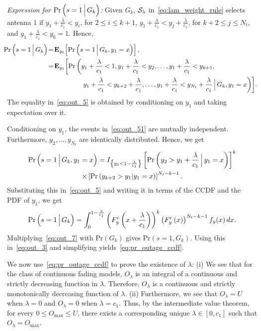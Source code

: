 \documentclass[12pt,draftcls,peerreview,onecolumn]{IEEEtran}
\newcommand{\brac}[1]{\left({#1}\right)}
\newcommand{\cbrac}[1]{\left\{{#1}\right\}}
\newcommand{\indic}[1]{I_{\cbrac{#1}}}
\newcommand{\prob}[1]{\text{Pr}\brac{#1}}
\newcommand{\given}{\arrowvert}
\newcommand{\Given}{\Big\arrowvert}
\newcommand{\setG}{G}
\newcommand{\setGk}{\setG_k}
\newcommand{\lam}{\lambda}
\newcommand{\Nt}{{N_t}}
\newcommand{\outmax}{O_{\text{max}}}
\newcommand{\cone}{c_{1}}
\newcommand{\out}{O}
\newcommand{\m}{\cone}
\newcommand{\lambym}{\frac{\lam}{\m}}
\newcommand{\yk}[1]{y_{#1}}
\newcommand{\ykplambym}[1]{\yk{#1}+\lambym}
\newcommand{\un}{U}
\newcommand{\callamrule}{{\cal S_{{\lam}}}}
\newcommand{\outlam}{\out_{\lam}}
\begin{document}
{\em Expression for $\prob{s = 1\Given\setGk}$:} Given $\setGk$, $\callamrule$ in~\eqref{eq:lam_weight_rule} selects antenna 1 if $\ykplambym{1}<\yk{i}$, for $2\leq i \leq k+1$,  $\ykplambym{1}<\ykplambym{j}$, for $k+2\leq j \leq \Nt$, and $\ykplambym{1}<\yk{0}=1$. Hence,
%
\begin{align}
\label{eq:out_5}
\!\!\!\prob{s = 1\Given \setGk }&\!=\!{\bf{E}}_{\yk{1}}\!\left[\prob{s = 1\Given\setGk,\yk{1}=x}\right] ,\\
\label{eq:out_51}
&\!=\!{\bf{E}}_{\yk{1}}\!\left[\text{Pr}\left(\ykplambym{1} < 1, \ykplambym{1}<\yk{2}, \dots ,\ykplambym{1}<\yk{k+1},\right.\right.\nonumber\\
&\quad\quad\quad\quad\quad\left.\left.
\ykplambym{1}<\ykplambym{k+2}, \dots ,\ykplambym{1}<\ykplambym{\Nt}\Given\setGk,\yk{1}=x\right)\right]\!.
\end{align} 
%
The equality in~\eqref{eq:out_5} is obtained by conditioning on $\yk{1}$ and taking expectation over it. 

Conditioning on $\yk{1}$, the events in~\eqref{eq:out_51} are mutually independent. Furthermore, $\yk{2},\ldots,\yk{\Nt} $ are identically distributed. Hence, we get
%
\begin{multline}
\text{Pr}\brac{s=1\Given \setGk, \yk{1}=x} = \indic{\yk{1}<1-\lambym}\left[\text{Pr}\brac{\yk{2}>\yk{1}+\lambym\Given\yk{1}=x}\right]^{k}\\\times \left[\text{Pr}\brac{\yk{k+2}>\yk{1}\given\yk{1}=x}\right]^{\Nt-k-1}.
\label{eq:out_6}
\end{multline}
%
Substituting this in~\eqref{eq:out_5} and writing it in terms of the CCDF and the PDF of $\yk{1}$, we get 
\begin{equation}
\text{Pr}\brac{s=1\Given\setGk} =\int_{0}^{1-\lambym}\left(F_{y}^{c}\left(x+\lambym\right)\right)^k \left(F_{y}^{c}\left(x\right)\right)^{\Nt-k-1}f_{y}(x)\,dx.
\label{eq:out_7}
\end{equation}
Multiplying~\eqref{eq:out_7} with $\prob{\setGk}$ gives $\prob{s=1,\setGk}$. Using this in~\eqref{eq:out_3} and simplifying yields~\eqref{eq:pr_outage_ccdf}.

We now use~\eqref{eq:pr_outage_ccdf} to prove the existence of $\lam$: (i) We see that for the class of continuous fading models, $\outlam$ is an integral of a continuous and strictly decreasing  function in $\lam$. Therefore, $\outlam$ is a continuous and strictly monotonically decreasing function of $\lam$. (ii) Furthermore,  we see that $\outlam=\un$ when $\lam=0$ and $\outlam=0$ when $\lam=\cone$. Thus, by the intermediate value theorem, for every $0\leq\outmax\leq\un$,  there exists a corresponding unique $\lam\in[0,\m]$ such that $\outlam=\outmax$. 
  
\end{document}
